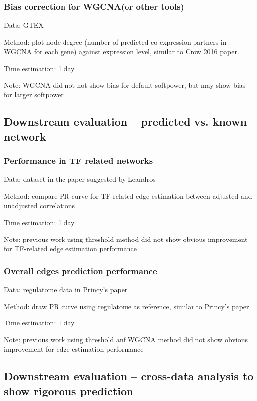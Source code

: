 \documentclass[english,letterpaper,pdftex,12pt]{article}
\begin{document}
\subsubsection*{Bias correction for WGCNA(or other tools)}

Data: GTEX

Method: plot node degree (number of predicted co-expression partners in WGCNA for each gene) against expression level, similar to Crow 2016 paper.

Time estimation: 1 day

Note: WGCNA did not not show bias for default softpower, but may show bias for larger softpower

\subsection*{Downstream evaluation -- predicted vs. known network}
\subsubsection*{Performance in TF related networks}

Data: dataset in the paper suggested by Leandros

Method: compare PR curve for TF-related edge estimation between adjusted and unadjusted correlations

Time estimation: 1 day

Note: previous work using threshold method did not show obvious improvement for TF-related edge estimation performance 

\subsubsection*{Overall edges prediction performance}

Data: regulatome data in Princy's paper

Method: draw PR curve using regulatome as reference, similar to Princy's paper

Time estimation: 1 day

Note: previous work using threshold anf WGCNA method did not show obvious improvement for edge estimation performance 


\subsection*{Downstream evaluation -- cross-data analysis to show rigorous prediction}
\end{document}
